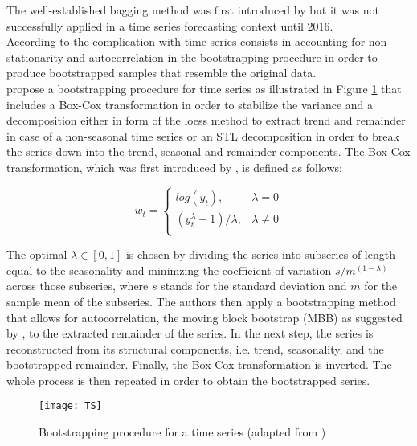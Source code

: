 \noindent The well-established bagging method was first introduced by \textcite{breiman1996} but it was not successfully applied in a time series forecasting context until 2016.\\
According to \textcite{petropoulos2018} the complication with time series consists in accounting for non-stationarity and autocorrelation in the bootstrapping procedure in order to produce bootstrapped samples that resemble the original data.\\
\textcite{bergmeir} propose a bootstrapping procedure for time series as illustrated in Figure \ref{fig: Bootstrapping procedure TS} that includes a Box-Cox transformation in order to stabilize the variance and a decomposition either in form of the loess method to extract trend and remainder in case of a non-seasonal time series or an STL decomposition in order to break the series down into the trend, seasonal and remainder components. 
The Box-Cox transformation, which was first introduced by \textcite{box1964}, is defined as follows:

\begin{equation}
	w_{t} =
	\begin{cases}
	log(y_{t}), & \lambda=0 \\
	(y_{t}^\lambda-1)/\lambda, & \lambda \neq0\\
	\end{cases}
\end{equation}

The optimal $\lambda \in [0,1]$ is chosen by dividing the series into subseries of length equal to the seasonality and minimzing the coefficient of variation $s/m^{(1-\lambda)}$ across those subseries, where $s$ stands for the standard deviation and $m$ for the sample mean of the subseries.
The authors then apply a bootstrapping method that allows for autocorrelation, the moving block bootstrap (MBB) as suggested by \textcite{kunsch1989}, to the extracted remainder of the series. In the next step, the series is reconstructed from its structural components, i.e. trend, seasonality, and the bootstrapped remainder. Finally, the Box-Cox transformation is inverted. The whole process is then repeated in order to obtain the bootstrapped series.\\ 


\begin{figure} [h]
\centering
\texttt{[image: TS]}
\caption{Bootstrapping procedure for a time series (adapted from \textcite{petropoulos2018})}
\label{fig: Bootstrapping procedure TS}
\end{figure}

